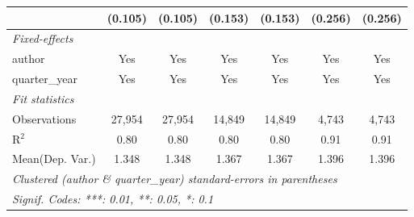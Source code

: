 \begin{tabular}{lcccccc}
                                         & (0.105)       & (0.105)       & (0.153)       & (0.153)       & (0.256)      & (0.256)\\   
   \midrule
   \emph{Fixed-effects}\\
   author                                & Yes           & Yes           & Yes           & Yes           & Yes          & Yes\\  
   quarter\_year                         & Yes           & Yes           & Yes           & Yes           & Yes          & Yes\\  
   \midrule
   \emph{Fit statistics}\\
   Observations                          & 27,954        & 27,954        & 14,849        & 14,849        & 4,743        & 4,743\\  
   R$^2$                                 & 0.80          & 0.80          & 0.80          & 0.80          & 0.91         & 0.91\\  
Mean(Dep. Var.) & 1.348 & 1.348 & 1.367 & 1.367 & 1.396 & 1.396 \\
   \midrule \midrule
   \multicolumn{7}{l}{\emph{Clustered (author \& quarter\_year) standard-errors in parentheses}}\\
   \multicolumn{7}{l}{\emph{Signif. Codes: ***: 0.01, **: 0.05, *: 0.1}}\\
\end{tabular}
\par\endgroup
